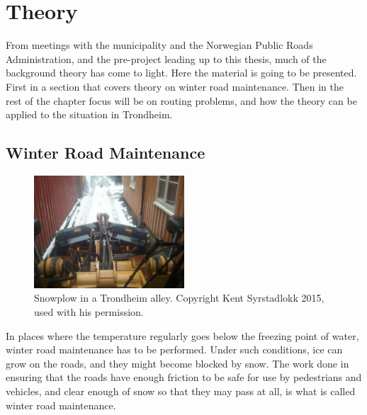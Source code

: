 \chapter{Theory}
\label{theory}

From meetings with the municipality and the Norwegian Public Roads Administration, and the pre-project leading up to this thesis, much of the background theory has come to light. Here the material is going to be presented. First in a section that covers theory on winter road maintenance. Then in the rest of the chapter focus will be on routing problems, and how the theory can be applied to the situation in Trondheim.

\section{Winter Road Maintenance} %
\label{sec:snow_plowing}


\begin{figure}
    \begin{center}
        \includegraphics[width=0.5\textwidth]{figures/MachineryIllustrations/snowplow-Kent_Syrstadlokk-2012-04-18.jpg}
    \end{center}
    \caption{Snowplow in a Trondheim alley. Copyright Kent Syrstadlokk 2015, used with his permission.}
    \label{fig:snowplow_in_alley}
\end{figure}

In places where the temperature regularly goes below the freezing point of water, winter road maintenance has to be performed. Under such conditions, ice can grow on the roads, and they might become blocked by snow. The work done in ensuring that the roads have enough friction to be safe for use by pedestrians and vehicles, and clear enough of snow so that they may pass at all, is what is called winter road maintenance.

